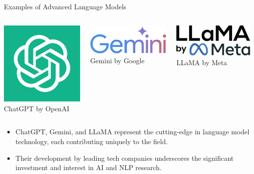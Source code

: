 \documentclass{beamer}
\begin{document}
\begin{frame}{Examples of Advanced Language Models}
    \begin{columns}
        \centering
        \includegraphics[width=0.8\linewidth]{chat-gpt.jpg}\\
        ChatGPT by OpenAI

        \centering
        \includegraphics[width=0.8\linewidth]{gemini.png}\\
        Gemini by Google

        \centering
        \includegraphics[width=0.8\linewidth]{llama.png}\\
        LLaMA by Meta
    \end{columns}
    \vfill
    \begin{itemize}
        \item ChatGPT, Gemini, and LLaMA represent the cutting-edge in language model technology, each contributing uniquely to the field.
        \item Their development by leading tech companies underscores the significant investment and interest in AI and NLP research.
    \end{itemize}
\end{frame}
\end{document}
